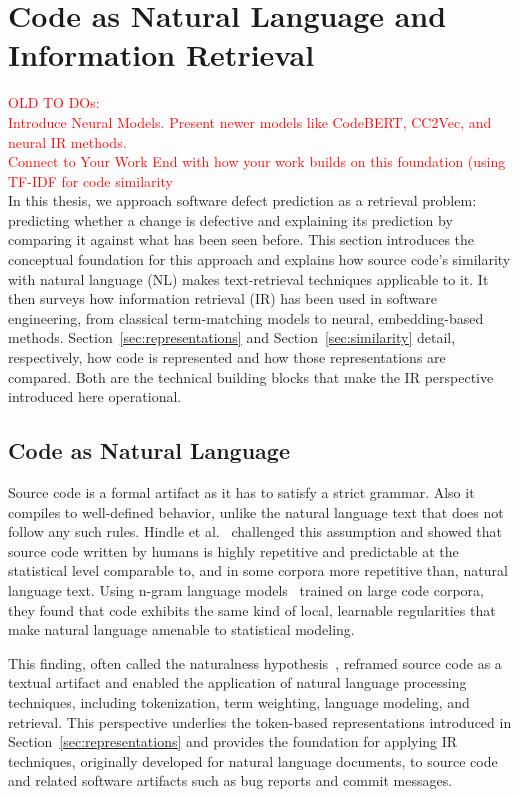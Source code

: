 \documentclass[\main/thesis.tex]{subfiles}
\begin{document}
\section{Code as Natural Language and Information Retrieval}
\label{sec:code-as-nl-ir}

\textcolor{red}{OLD TO DOs:}\\
\textcolor{red}{ Introduce Neural Models.
	Present newer models like CodeBERT, CC2Vec, and neural IR methods.}\\
\textcolor{red}{ Connect to Your Work
	End with how your work builds on this foundation (using TF-IDF for code similarity}\\

In this thesis, we approach software defect prediction as a retrieval problem: predicting whether a change is defective and explaining its prediction by comparing it against what has been seen before. This section introduces the conceptual foundation for this approach and explains how source code's similarity with natural language (NL) makes text-retrieval techniques applicable to it. It then surveys how information retrieval (IR) has been used in software engineering, from classical term-matching models to neural, embedding-based methods. Section~\ref{sec:representations} and Section~\ref{sec:similarity} detail, respectively, how code is represented and how those representations are compared. Both are the technical building blocks that make the IR perspective introduced here operational.

\subsection{Code as Natural Language}
\label{sec:code-as-nl}
Source code is a formal artifact as it has to satisfy a strict grammar. Also it compiles to well-defined behavior, unlike the natural language text that does not follow any such rules. Hindle et al.~\cite{hindle2012} challenged this assumption and showed that source code written by humans is highly repetitive and predictable at the statistical level comparable to, and in some corpora more repetitive than, natural language text. Using n-gram language models~\cite{majumder2002n} trained on large code corpora, they found that code exhibits the same kind of local, learnable regularities that make natural language amenable to statistical modeling.

This finding, often called the naturalness hypothesis~\cite{hindle2016naturalness}, reframed source code as a textual artifact and enabled the application of natural language processing techniques, including tokenization, term weighting, language modeling, and retrieval. This perspective underlies the token-based representations introduced in Section~\ref{sec:representations} and provides the foundation for applying IR techniques, originally developed for natural language documents, to source code and related software artifacts such as bug reports and commit messages.
\end{document}
